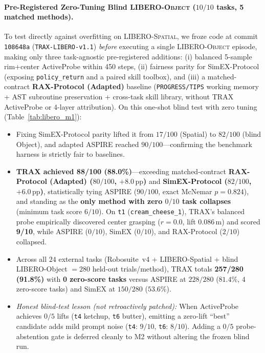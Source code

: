 \documentclass{trax}
\begin{document}
\paragraph{Pre-Registered Zero-Tuning Blind \textsc{LIBERO-Object} ($10/10$ tasks, 5 matched methods).} To test directly against overfitting on \textsc{LIBERO-Spatial}, we froze code at commit \texttt{108648a} (\texttt{TRAX-LIBERO-v1.1}) \emph{before} executing a single \textsc{LIBERO-Object} episode, making only three task-agnostic pre-registered additions: (i) balanced 5-sample rim+center ActiveProbe within 450 steps, (ii) fairness parity for SimEX-Protocol (exposing \texttt{policy\_return} and a paired skill toolbox), and (iii) a matched-contract \textbf{RAX-Protocol (Adapted)} baseline (\texttt{PROGRESS/TIPS} working memory + AST subroutine preservation + cross-task skill library, without TRAX ActiveProbe or 4-layer attribution). On this one-shot blind test with zero tuning (Table~\ref{tab:libero_m1}):
\begin{itemize}
    \item Fixing SimEX-Protocol parity lifted it from $17/100$ (Spatial) to $82/100$ (blind Object), and adapted ASPIRE reached $90/100$---confirming the benchmark harness is strictly fair to baselines.
    \item \textbf{TRAX achieved 88/100 (88.0\%)}---exceeding matched-contract \textbf{RAX-Protocol (Adapted) ($80/100$, $+8.0\,\mathrm{pp}$)} and \textbf{SimEX-Protocol ($82/100$, $+6.0\,\mathrm{pp}$)}, statistically tying ASPIRE ($90/100$, exact McNemar $p{=}0.824$), and standing as the \textbf{only method with zero $0/10$ task collapses} (minimum task score $6/10$). On \texttt{t1} (\texttt{cream\_cheese\_1}), TRAX's balanced probe empirically discovered center grasping ($r{=}0.0$, lift $0.086\,\mathrm{m}$) and scored \textbf{9/10}, while ASPIRE ($0/10$), SimEX ($0/10$), and RAX-Protocol ($2/10$) collapsed.
    \item Across all $24$ external tasks (Robosuite~v4 + LIBERO-Spatial + blind LIBERO-Object $= 280$ held-out trials/method), TRAX totals \textbf{257/280 (91.8\%)} with \textbf{0 zero-score tasks} versus ASPIRE at $228/280$ ($81.4\%$, $4$ zero-score tasks) and SimEX at $150/280$ ($53.6\%$).
    \item \emph{Honest blind-test lesson (not retroactively patched):} When ActiveProbe achieves $0/5$ lifts (\texttt{t4} ketchup, \texttt{t6} butter), emitting a zero-lift ``best'' candidate adds mild prompt noise (\texttt{t4}: $9/10$, \texttt{t6}: $8/10$). Adding a $0/5$ probe-abstention gate is deferred cleanly to M2 without altering the frozen blind run.
\end{itemize}
\end{document}
